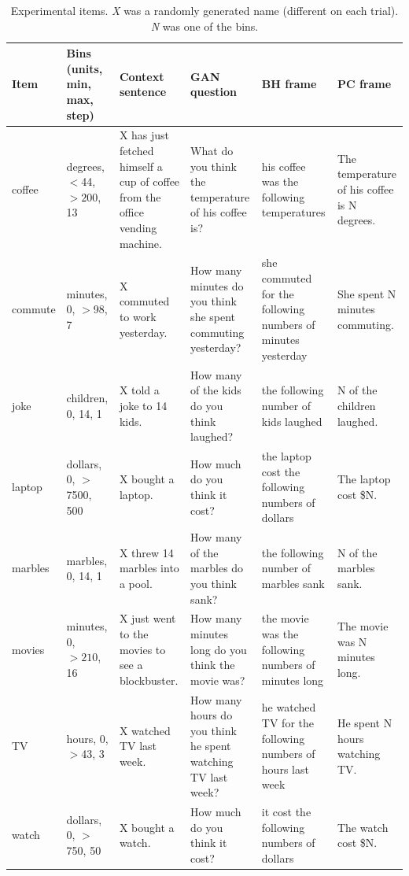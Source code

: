 \documentclass[10pt,letterpaper]{article}
\begin{document}
\begin{table}
  \centering
  \begin{tabular}{l p{2.2cm} p{2.5cm} p{3.5cm} p{3cm} p{2.5cm}}
	\toprule
	Item & Bins (units, min, max, step) & Context sentence & GAN question & BH frame & PC frame \\
	\midrule
    coffee & degrees, $<$44, $>200$, 13& X has just fetched himself a cup of coffee from the office vending machine. & What do you think the temperature of his coffee is?  & his coffee was the following temperatures & The temperature of his coffee is N degrees.\\
	commute & minutes, 0, $>$98, 7 & X commuted to work yesterday. & How many minutes do you think she spent commuting yesterday? & she commuted for the following numbers of minutes yesterday & She spent N minutes commuting.\\
	joke & children, 0, 14, 1  & X told a joke to 14 kids. & How many of the kids do you think laughed? & the following number of kids laughed & N of the children laughed.\\
    
	laptop & dollars, 0, $>$7500, 500& X bought a laptop. & How much do you think it cost? & the laptop cost the following numbers of dollars & The laptop cost \$N.\\
    marbles & marbles, 0, 14, 1 & X threw 14 marbles into a pool. & How many of the marbles do you think sank? & the following number of marbles sank & N of the marbles sank.\\

	movies & minutes, 0, $>210$, 16& X just went to the movies to see a blockbuster. & How many minutes long do you think the movie was? & the movie was the following numbers of minutes long & The movie was N minutes long.\\

	TV & hours, 0, $>$43, 3& X watched TV last week. & How many hours do you think he spent watching TV last week? & he watched TV for the following numbers of hours last week & He spent N hours watching TV.\\

	watch & dollars, 0, $>$750, 50 & X bought a watch.& How much do you think it cost? & it cost the following numbers of dollars & The watch cost \$N.\\
    \bottomrule
  \end{tabular}
  \caption{Experimental items. \emph{X} was a randomly generated name (different on each trial). \emph{N} was one of the bins.}
  \label{tab:Items}
\end{table}
\end{document}
